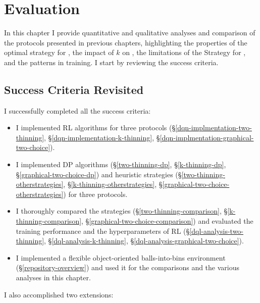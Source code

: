 \chapter{Evaluation}\label{evaluation}


\ifpdf
    \graphicspath{{Chapter3/Figs/Raster/}{Chapter3/Figs/PDF/}{Chapter3/Figs/}}
\else
    \graphicspath{{Chapter3/Figs/Vector/}{Chapter3/Figs/}}
\fi


In this chapter I provide quantitative and qualitative analyses and comparison of the protocols presented in previous chapters, highlighting the properties of the optimal \DP strategy for \TwoThinning, the impact of $k$ on \KThinning, the limitations of the \Greedy Strategy for \GraphicalTwoChoice, and the patterns in \DQL training. I start by reviewing the success criteria.


\section{Success Criteria Revisited}

I successfully completed all the success criteria:

\begin{itemize}
    \item 
    I implemented \DQL RL algorithms for three protocols (\S\ref{dqn-implmentation-two-thinning}, \S\ref{dqn-implementation-k-thinning}, \S\ref{dqn-implmentation-graphical-two-choice}).
    \item
    I implemented DP algorithms (\S\ref{two-thinning-dp}, \S\ref{k-thinning-dp}, \S\ref{graphical-two-choice-dp}) and heuristic strategies (\S\ref{two-thinning-otherstrategies}, \S\ref{k-thinning-otherstrategies}, \S\ref{graphical-two-choice-otherstrategies}) for three protocols.
    \item
    I thoroughly compared the strategies (\S\ref{two-thinning-comparison}, \S\ref{k-thinning-comparison}, \S\ref{graphical-two-choice-comparison}) and evaluated the training performance and the hyperparameters of RL (\S\ref{dql-analysis-two-thinning}, \S\ref{dql-analysis-k-thinning}, \S\ref{dql-analysis-graphical-two-choice}).
    \item
    I implemented a flexible object-oriented balls-into-bins environment (\S\ref{repository-overview}) and used it for the comparisons and the various analyses in this chapter.
\end{itemize}


I also accomplished two extensions:



